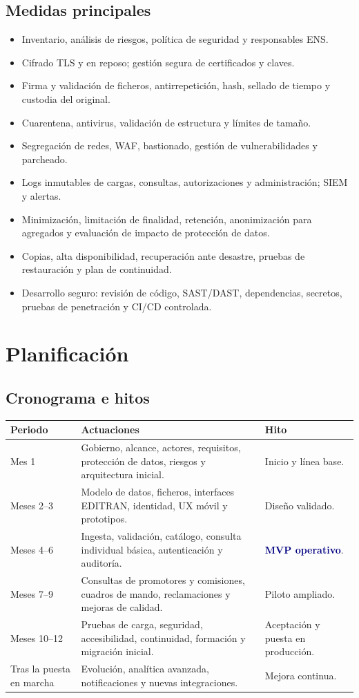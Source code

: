 \documentclass[11pt,a4paper]{article}
\newcommand{\key}[1]{\textbf{\textcolor{navy}{#1}}}
\begin{document}
\subsection{Medidas principales}
\begin{itemize}
\item Inventario, análisis de riesgos, política de seguridad y responsables ENS.
\item Cifrado TLS y en reposo; gestión segura de certificados y claves.
\item Firma y validación de ficheros, antirrepetición, hash, sellado de tiempo y custodia del original.
\item Cuarentena, antivirus, validación de estructura y límites de tamaño.
\item Segregación de redes, WAF, bastionado, gestión de vulnerabilidades y parcheado.
\item Logs inmutables de cargas, consultas, autorizaciones y administración; SIEM y alertas.
\item Minimización, limitación de finalidad, retención, anonimización para agregados y evaluación de impacto de protección de datos.
\item Copias, alta disponibilidad, recuperación ante desastre, pruebas de restauración y plan de continuidad.
\item Desarrollo seguro: revisión de código, SAST/DAST, dependencias, secretos, pruebas de penetración y CI/CD controlada.
\end{itemize}

\section{Planificación}

\subsection{Cronograma e hitos}
\begin{center}
\begin{tabularx}{0.95\textwidth}{l Y Y}\toprule
\textbf{Periodo} & \textbf{Actuaciones} & \textbf{Hito}\\\midrule
Mes 1 & Gobierno, alcance, actores, requisitos, protección de datos, riesgos y arquitectura inicial. & Inicio y línea base.\\
Meses 2--3 & Modelo de datos, ficheros, interfaces EDITRAN, identidad, UX móvil y prototipos. & Diseño validado.\\
Meses 4--6 & Ingesta, validación, catálogo, consulta individual básica, autenticación y auditoría. & \key{MVP operativo}.\\
Meses 7--9 & Consultas de promotores y comisiones, cuadros de mando, reclamaciones y mejoras de calidad. & Piloto ampliado.\\
Meses 10--12 & Pruebas de carga, seguridad, accesibilidad, continuidad, formación y migración inicial. & Aceptación y puesta en producción.\\
Tras la puesta en marcha & Evolución, analítica avanzada, notificaciones y nuevas integraciones. & Mejora continua.\\\bottomrule
\end{tabularx}\end{center}
\end{document}
